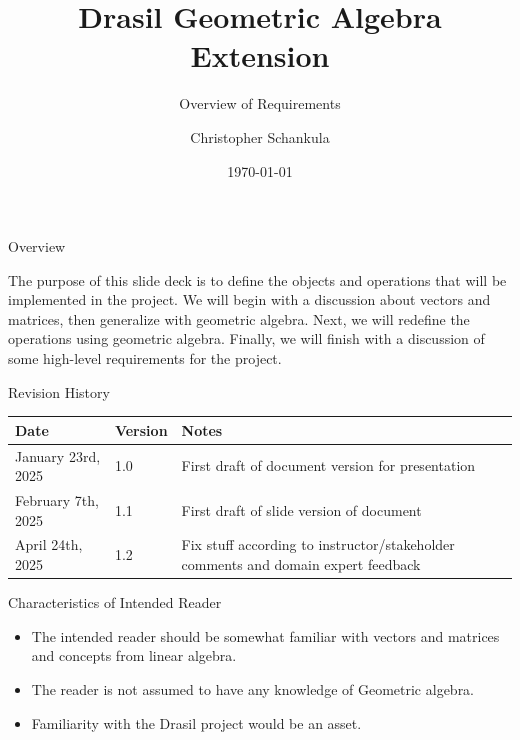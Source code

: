 \documentclass[aspectratio=169,xcolor=dvipsnames]{beamer}
\title{Drasil Geometric Algebra Extension}
\subtitle{Overview of Requirements}
\author{Christopher Schankula}
\institute
{
    Department of Computing \& Software \\
    McMaster University %
}
\date{\today} %
\begin{document}
\begin{frame}
    \titlepage
\end{frame}

\begin{frame}{Overview}
    \tableofcontents

    The purpose of this slide deck is to define the objects and operations that will
    be implemented in the project. We will begin with a discussion about vectors and
    matrices, then generalize with geometric algebra. Next, we will redefine the
    operations using geometric algebra. Finally, we will finish with a discussion of
    some high-level requirements for the project.
\end{frame}

\begin{frame}{Revision History}
      \begin{tabularx}{\textwidth}{p{4cm}p{2cm}X}
            \toprule {\bf Date} & {\bf Version} & {\bf Notes}\\
            \midrule
            January 23rd, 2025 & 1.0 & First draft of document version for presentation\\
            February 7th, 2025 & 1.1 & First draft of slide version of document\\
            April 24th, 2025 & 1.2 & Fix stuff according to instructor/stakeholder comments and domain expert feedback\\
            \bottomrule
      \end{tabularx}
\end{frame}

\begin{frame}{Characteristics of Intended Reader}
      \begin{itemize}
      \item The intended reader should be somewhat familiar with vectors and matrices
            and concepts from linear algebra.
      \item The reader is not assumed to have any knowledge of Geometric algebra.
      \item Familiarity with the Drasil project would be an asset.
      \end{itemize}
\end{frame}
\end{document}
